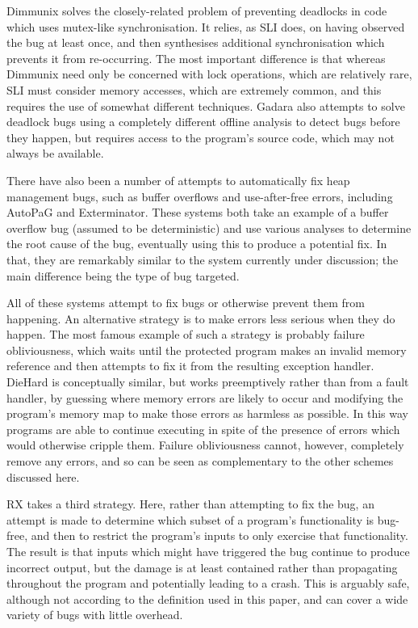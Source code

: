 \documentclass[10pt,twocolumn,preprint,natbib,authoryear]{sigplanconf}
\begin{document}
Dimmunix\cite{Jula2008} solves the closely-related problem of
preventing deadlocks in code which uses mutex-like synchronisation.
It relies, as SLI does, on having observed the bug at least once, and
then synthesises additional synchronisation which prevents it from
re-occurring.  The most important difference is that whereas Dimmunix
need only be concerned with lock operations, which are relatively
rare, SLI must consider memory accesses, which are extremely common,
and this requires the use of somewhat different techniques.
Gadara\cite{Wang2008} also attempts to solve deadlock bugs using a
completely different offline analysis to detect bugs before they
happen, but requires access to the program's source code, which may
not always be available.

There have also been a number of attempts to automatically fix heap
management bugs, such as buffer overflows and use-after-free errors,
including AutoPaG\cite{Lin2007} and Exterminator\cite{Novark2007}.
These systems both take an example of a buffer overflow bug (assumed
to be deterministic) and use various analyses to determine the root
cause of the bug, eventually using this to produce a potential fix.
In that, they are remarkably similar to the system currently under
discussion; the main difference being the type of bug targeted.

All of these systems attempt to fix bugs or otherwise prevent them
from happening.  An alternative strategy is to make errors less
serious when they do happen.  The most famous example of such a
strategy is probably failure obliviousness\cite{Rinard2004}, which
waits until the protected program makes an invalid memory reference
and then attempts to fix it from the resulting exception handler.
DieHard\cite{Berger2006} is conceptually similar, but works
preemptively rather than from a fault handler, by guessing where
memory errors are likely to occur and modifying the program's memory
map to make those errors as harmless as possible.  In this way
programs are able to continue executing in spite of the presence of
errors which would otherwise cripple them.  Failure obliviousness
cannot, however, completely remove any errors, and so can be seen as
complementary to the other schemes discussed here.

RX\cite{Qin2007} takes a third strategy.  Here, rather than
attempting to fix the bug, an attempt is made to determine which
subset of a program's functionality is bug-free, and then to restrict
the program's inputs to only exercise that functionality.  The result
is that inputs which might have triggered the bug continue to produce
incorrect output, but the damage is at least contained rather than
propagating throughout the program and potentially leading to a crash.
This is arguably safe, although not according to the definition used
in this paper, and can cover a wide variety of bugs with little
overhead.
\end{document}
